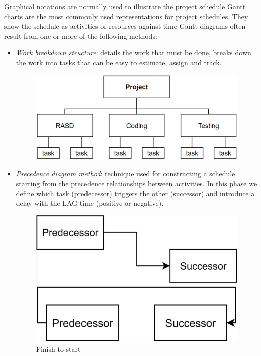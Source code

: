 Graphical notations are normally used to illustrate the project schedule
Gantt charts are the most commonly used representations for project schedules.
They show the schedule as activities or resources against time
Gantt diagrams often result from one or more of the following methods: 
\begin{itemize}
    \item \textit{Work breakdown structure}: details the work that must be done, breaks down the work into tasks that can be easy to estimate, assign and track. 
        \begin{figure}[H]
            \centering
            \includegraphics[width=0.5\linewidth]{images/wbs.png}
        \end{figure}
    \item \textit{Precedence diagram method}: technique used for constructing a schedule starting from the precedence relationships between activities. 
        In this phase we define which task (predecessor) triggers the other (successor) and introduce a delay with the LAG time (positive or negative). 
        \begin{figure}[H] 
            \centering
            \begin{minipage}[b]{0.4\linewidth}
                \centering
                \includegraphics[width=0.9\linewidth]{images/fts.png} 
                \caption*{Finish to start} 
                \vspace{4ex}
            \end{minipage}%
            \begin{minipage}[b]{0.4\linewidth}
                \centering
                \includegraphics[width=0.9\linewidth]{images/stf.png} 

\end{minipage}
\end{figure}
\end{itemize}
